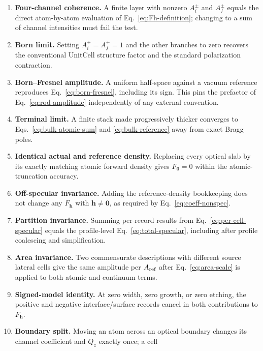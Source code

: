 \begin{enumerate}
  \item \textbf{Four-channel coherence.}  A finite layer with nonzero
        $A_i^\pm$ and $A_f^\pm$ equals the direct atom-by-atom evaluation of
        Eq.~\eqref{eq:Fh-definition}; changing to a sum of channel intensities
        must fail the test.
  \item \textbf{Born limit.}  Setting $A_i^+=A_f^+=1$ and the other branches to
        zero recovers the conventional UnitCell structure factor and the
        standard polarization contraction.
  \item \textbf{Born--Fresnel amplitude.}  A uniform half-space against a
        vacuum reference reproduces Eq.~\eqref{eq:born-fresnel}, including its
        sign.  This pins the prefactor of Eq.~\eqref{eq:rod-amplitude}
        independently of any external convention.
  \item \textbf{Terminal limit.}  A finite stack made progressively thicker
        converges to Eqs.~\eqref{eq:bulk-atomic-sum} and
        \eqref{eq:bulk-reference} away from exact Bragg poles.
  \item \textbf{Identical actual and reference density.}  Replacing every
        optical slab by its exactly matching atomic forward density gives
        $F_{\bm 0}=0$ within the atomic-truncation accuracy.
  \item \textbf{Off-specular invariance.}  Adding the reference-density
        bookkeeping does not change any $F_{\bm h}$ with $\bm h\neq\bm0$, as
        required by Eq.~\eqref{eq:coeff-nonspec}.
  \item \textbf{Partition invariance.}  Summing per-record results from
        Eq.~\eqref{eq:per-cell-specular} equals the profile-level
        Eq.~\eqref{eq:total-specular}, including after profile coalescing and
        simplification.
  \item \textbf{Area invariance.}  Two commensurate descriptions with different
        source lateral cells give the same amplitude per $A_{\rm ref}$ after
        Eq.~\eqref{eq:area-scale} is applied to both atomic and continuum
        terms.
  \item \textbf{Signed-model identity.}  At zero width, zero growth, or zero
        etching, the positive and negative interface/surface records cancel in
        both contributions to $F_{\bm h}$.
  \item \textbf{Boundary split.}  Moving an atom across an optical boundary
        changes its channel coefficient and $Q_z$ exactly once; a cell

\end{enumerate}
